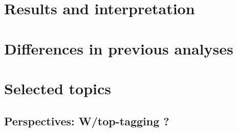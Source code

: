 \section{Results and interpretation}

\section{Differences in previous analyses}

\section{Selected topics}

\subsection{Perspectives: W/top-tagging ?}



	



	
